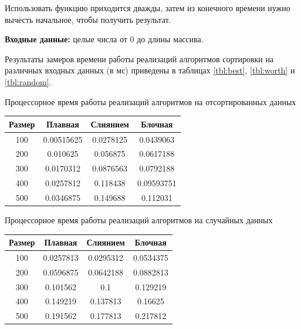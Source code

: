 Использовать функцию приходится дважды, затем из конечного времени нужно вычесть начальное, чтобы получить результат.

\textbf{Входные данные:} целые числа от 0 до длины массива.

Результаты замеров времени работы реализаций алгоритмов сортировки на различных входных данных (в мс) приведены в таблицах \ref{tbl:best}, \ref{tbl:worth} и \ref{tbl:random}.


	\begin{center}
		\begin{threeparttable}
				\caption{Процессорное время работы реализаций алгоритмов на отсортированных данных}
			\label{tbl:best}
			\begin{tabular}{|c|c|c|c|}
				\hline
				Размер & Плавная &  Слиянием &  Блочная \\
				\hline
				100 & 0.00515625 & 0.0278125 &  0.0439063\\ 
				\hline
				200 & 0.010625 & 0.056875 & 0.0617188 \\ 
				\hline
				300 & 0.0170312 & 0.0876563 & 0.0792188 \\ 
				\hline
				400 & 0.0257812 & 0.118438 & 0.09593751 \\ 
				\hline
				500 & 0.0346875 & 0.149688 & 0.112031 \\ 
				\hline
			\end{tabular}
	
		\end{threeparttable}
	\end{center}




	\begin{center}
		\begin{threeparttable}
				\caption{Процессорное время работы реализаций алгоритмов на случайных данных}
			\label{tbl:worth}
			\begin{tabular}{|c|c|c|c|}
			\hline
			Размер & Плавная &  Слиянием &  Блочная \\
			\hline
			100 & 0.0257813 & 0.0295312 & 0.0534375\\ 
			\hline
			200 & 0.0596875 & 0.0642188 & 0.0882813 \\ 
			\hline
			300 & 0.101562 & 0.1 & 0.129219 \\ 
			\hline
			400 & 0.149219 & 0.137813 & 0.16625 \\ 
			\hline
			500 & 0.191562 & 0.177813 & 0.217812 \\ 
			\hline
			\end{tabular}
		
		\end{threeparttable}
	\end{center}




